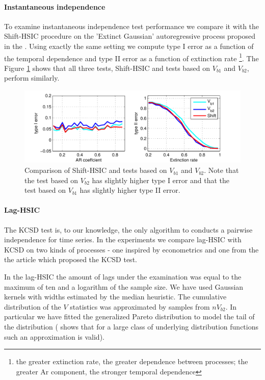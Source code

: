\documentclass{article} %
\begin{document}
\paragraph{Instantaneous independence}
To examine instantaneous independence test performance we compare it with the Shift-HSIC procedure \cite{chwialkowski2014kernel} on the 'Extinct Gaussian' autoregressive process proposed in the \cite[Section 4.1]{chwialkowski2014kernel}. Using exactly the same setting we compute type I error as a function of the temporal dependence and type II error as a function of extinction rate \footnote{the greater extinction rate, the greater dependence between processes; the greater Ar component, the stronger temporal dependence}. The Figure \ref{fig:arExtinct} shows that all three tests, Shift-HSIC and tests based on $V_{b1}$ and $V_{b2}$, perform similarly.   

\begin{figure}
\centering  
\includegraphics[width=1\textwidth]{arExtinct.pdf}
\caption{Comparison of Shift-HSIC and tests based on $V_{b1}$ and $V_{b2}$. Note that the test based on $V_{b2}$ has slightly higher type I error and that the test based on $V_{b1}$ has slightly  higher type II error.}
\label{fig:arExtinct}
\end{figure}


\paragraph{Lag-HSIC}
The KCSD test \cite{besserve_statistical_2013} is, to our knowledge, the only algorithm to conducts a pairwise independence for time series. In the experiments we compare lag-HSIC with KCSD on two kinds of processes - one  inspired by econometrics and one from the the article which proposed the KCSD test. 

In the lag-HSIC the amount of lags under the examination was equal to the maximum of ten and a logarithm of the sample size. We have used Gaussian kernels with widths estimated by the median heuristic. The cumulative distribution of the $V$ statistics  was approximated by samples from $n V_{b2}$. In particular we have fitted the generalized Pareto distribution to model the tail of the distribution  (\cite{pickands1975statistical} shows that for a large class of underlying distribution functions such an approximation is valid).
\end{document}
